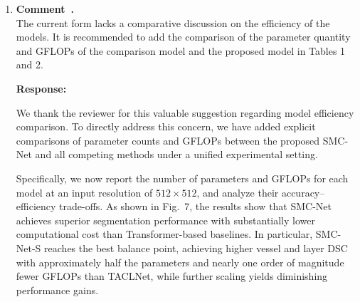 \documentclass[11pt]{article}
\newcommand{\commentresponse}[2]{{\color{blue}\textbf{Response:} #2}}
\newcommand{\commentitem}{\item \textbf{Comment~\arabic{enumi}.}\\\ignorespaces}
\begin{document}
\begin{enumerate}
    \commentresponse{3}{
    Thank you for pointing out this typesetting issue.
    In the revised manuscript, we have restructured and simplified the AMG-FFN formulation to improve clarity and conciseness.
    Specifically, the original expanded expression in Equation~(9)(Equation~(7) in the revised manuscript) has been replaced with a compact and abstracted formulation that summarizes the multi-scale depth-wise convolutions and adaptive gating mechanism in a single line.
    As a result, the revised equation naturally fits within the page margins without requiring line splitting, while preserving the original computational meaning of AMG-FFN.
    For convenience and ease of verification, we reproduce the full revised part description below in blue italics:\\
    \\
    \textit{{\color{blue}``\textbf{(b) AMG-FFN:} The Adaptive Multi-scale Gated Feed-Forward Network (AMG-FFN) is designed to enhance local feature modeling following the SSSD layer.
    Given an input feature map $h$, AMG-FFN extracts multi-scale local features using depth-wise convolutions with different kernel sizes and adaptively fuses them through a gating mechanism:
    \begin{equation}
    z = \mathcal{F}_{\text{linear}}\big(h \circ \mathcal{G}(\mathcal{F}_{\text{ms}}(h))\big)\tag{7},
    \end{equation}
    where $\mathcal{F}_{\text{ms}}(\cdot)$ denotes multi-scale depth-wise convolutional feature extraction, $\mathcal{G}(\cdot)$ represents adaptive gating, and $\circ$ is element-wise multiplication.
    This design enables AMG-FFN to selectively enhance fine-grained choroidal structures while maintaining computational efficiency.''
    }}
}

    \commentitem The current form lacks a comparative discussion on the efficiency of the models. It is recommended to add the comparison of the parameter quantity and GFLOPs of the comparison model and the proposed model in Tables 1 and 2.

    \commentresponse{4}{
    {\color{blue}
    We thank the reviewer for this valuable suggestion regarding model efficiency comparison.
    To directly address this concern, we have added explicit comparisons of parameter counts and GFLOPs between the proposed SMC-Net and all competing methods under a unified experimental setting.
    
    Specifically, we now report the number of parameters and GFLOPs for each model at an input resolution of $512\times512$, and analyze their accuracy--efficiency trade-offs.
    As shown in Fig.~7, the results show that SMC-Net achieves superior segmentation performance with substantially lower computational cost than Transformer-based baselines.
    In particular, SMC-Net-S reaches the best balance point, achieving higher vessel and layer DSC with approximately half the parameters and nearly one order of magnitude fewer GFLOPs than TACLNet, while further scaling yields diminishing performance gains.
    
}}
\end{enumerate}
\end{document}
